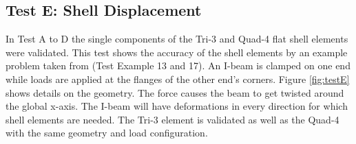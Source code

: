  \subsection{Test E: Shell Displacement}\label{sec:valid-E}
 In Test A to D the single components of the Tri-3 and Quad-4 flat shell elements were validated. This test shows the accuracy of the shell elements by an example problem taken from \cite{kansara2004development} (Test Example 13 and 17). An I-beam is clamped on one end while loads are applied at the flanges of the other end's corners. Figure \ref{fig:testE} shows details on the geometry. The force causes the beam to get twisted around the global x-axis. The I-beam will have deformations in every direction for which shell elements are needed. The Tri-3 element is validated as well as the Quad-4 with the same geometry and load configuration.
